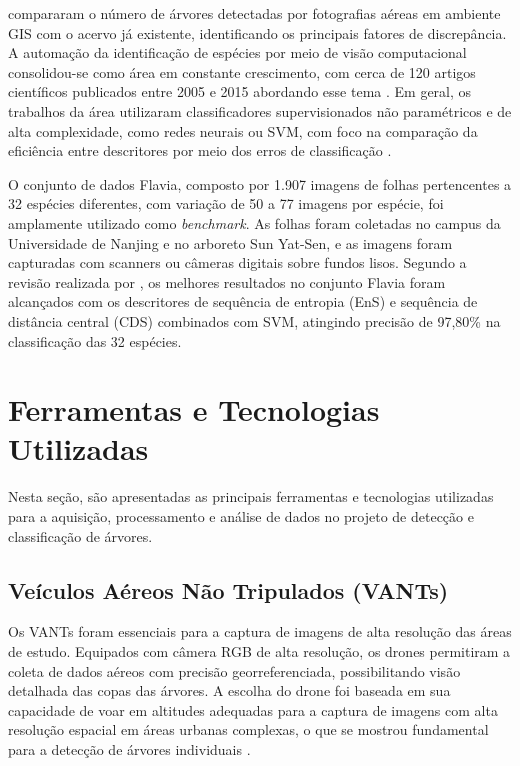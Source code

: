\documentclass[
    12pt,
    openright,
    oneside,
    a4paper,
    sumario=tradicional,
    english,
    brazil,
    ]{abntex2}
\begin{document}
\textcite{neto2012detecccao} compararam o número de árvores detectadas por fotografias aéreas em ambiente GIS com o acervo já existente, identificando os principais fatores de discrepância. A automação da identificação de espécies por meio de visão computacional consolidou-se como área em constante crescimento, com cerca de 120 artigos científicos publicados entre 2005 e 2015 abordando esse tema \cite{waldchen2018plant}. Em geral, os trabalhos da área utilizaram classificadores supervisionados não paramétricos e de alta complexidade, como redes neurais ou SVM, com foco na comparação da eficiência entre descritores por meio dos erros de classificação \cite{andrade2020visao}.

O conjunto de dados Flavia, composto por 1.907 imagens de folhas pertencentes a 32 espécies diferentes, com variação de 50 a 77 imagens por espécie, foi amplamente utilizado como \textit{benchmark}. As folhas foram coletadas no campus da Universidade de Nanjing e no arboreto Sun Yat-Sen, e as imagens foram capturadas com scanners ou câmeras digitais sobre fundos lisos. Segundo a revisão realizada por \textcite{waldchen2018plant}, os melhores resultados no conjunto Flavia foram alcançados com os descritores de sequência de entropia (EnS) e sequência de distância central (CDS) combinados com SVM, atingindo precisão de 97,80\% na classificação das 32 espécies.

\section{Ferramentas e Tecnologias Utilizadas}

Nesta seção, são apresentadas as principais ferramentas e tecnologias utilizadas para a aquisição, processamento e análise de dados no projeto de detecção e classificação de árvores.

\subsection{Veículos Aéreos Não Tripulados (VANTs)}

Os VANTs foram essenciais para a captura de imagens de alta resolução das áreas de estudo. Equipados com câmera RGB de alta resolução, os drones permitiram a coleta de dados aéreos com precisão georreferenciada, possibilitando visão detalhada das copas das árvores. A escolha do drone foi baseada em sua capacidade de voar em altitudes adequadas para a captura de imagens com alta resolução espacial em áreas urbanas complexas, o que se mostrou fundamental para a detecção de árvores individuais \cite{wu2024fine}.
\end{document}
